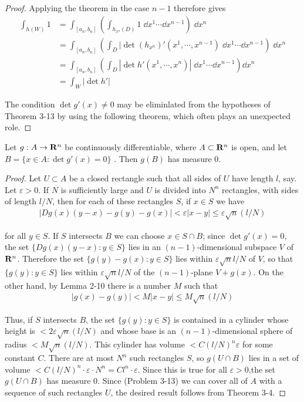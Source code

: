 \begin{proof}
Applying the theorem in the case $n-1$ therefore gives
\begin{align*}
    \int_{h(W)} 1 
    & = \int_{[a_n, b_n]} \left(\int_{h_{x^n}(D)} 1\;\dd x^1\cdots \dd x^{n-1}\right)\;\dd x^n \\
    & = \int_{[a_n, b_n]} \left(\int_{D} |\det (h_{x^n})'(x^1, \cdots, x^{n-1}) \;\dd x^1\cdots \dd x^{n-1}\right)\;\dd x^n \\
    & = \int_{[a_n, b_n]}^{}\left(\int_D |\det h'(x^1, \cdots, x^n)|\;\dd x^1\cdots \dd x^{n-1}\right)\dd x^n \\
    & = \int_W |\det h'|
\end{align*}

The condition $\det g'(x)\neq 0$ may be eliminlated from the hypotheses of Theorem 3-13 
by using the following theorem, which often plays an unexpected role.
\end{proof}

\begin{theorem}
    Let $g:A\to \mathbf{R}^n$ be continuously differentiable, where $A\subset \mathbf{R}^n$ is open, and 
    let $B=\{x\in A:\det g'(x)=0\}$ . Then $g(B)$ has measure 0.
    \label{test}
\end{theorem}

\begin{proof}
    Let $U\subset A$ be a closed rectangle such that all sides
of $U$ have length $l$, say. Let $\varepsilon > 0$. If $N$ is sufficiently large
and $U$ is divided into $N^n$ rectangles, with sides of length $l/N$,
then for each of these rectangles $S$, if $x\in S$ we have
\begin{align*}
    |Dg(x)(y-x) - g(y) - g(x)| 
    < \varepsilon |x-y|
    \le \varepsilon \sqrt{n}(l/N) 
\end{align*}

for all $y\in S$. If $S$ intersects $B$ we can choose $x\in S\cap B$;
since $\det g'(x)=0$, the set $\{Dg(x)(y-x):y\in S\}$ lies in an $(n-1)$-dimensional 
subspace $V$ of $\mathbf{R}^n$. Therefore the set $\{g(y)-g(x):y\in S\}$ lies within $\varepsilon\sqrt{n}l/N$
of $V$, so that $\{g(y):y\in S\}$ lies within $\varepsilon\sqrt{n}l/N$ of the $(n-1)$-plane 
$V+g(x)$. On the other hand, by Lemma 2-10 there is a number $M$ such that
\begin{align*}
    |g(x) - g(y)| < M|x-y| \le M\sqrt{n} (l/N)
\end{align*}

Thus, if $S$ intersects $B$, the set $\{g(y):y\in S\}$ is contained in a cylinder whose 
height is $<2\varepsilon \sqrt{n}(l/N)$ and whose base is an $(n-1)$-dimensional sphere
of radius $<M\sqrt{n}(l/N)$. This cylinder has volume $<C(l/N)^n\varepsilon$ for some constant $C$.
There are at most $N^n$ such rectangles $S$, so $g(U\cap B)$ lies in a set of volume $<C(l/N)^n\cdot 
\varepsilon \cdot N^n = Cl^n\cdot \varepsilon$. Since this is true for all $\varepsilon > 0$,the set 
$g(U\cap B)$ has measure 0. Since (Problem 3-13) we can cover all of $A$ with a sequence of such 
rectangles $U$, the desired result follows from Theorem 3-4. 
\end{proof}


